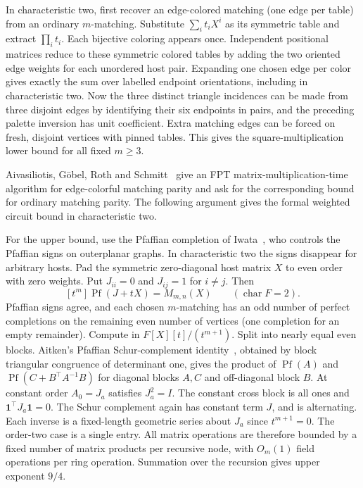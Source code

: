 \documentclass[11pt,letterpaper]{article}
\begin{document}
In characteristic two, first recover an edge-colored matching (one edge per table) from an ordinary \(m\)-matching. Substitute \(\sum_i t_iX^i\) as its symmetric table and extract \(\prod_i t_i\). Each bijective coloring appears once. Independent positional matrices reduce to these symmetric colored tables by adding the two oriented edge weights for each unordered host pair. Expanding one chosen edge per color gives exactly the sum over labelled endpoint orientations, including in characteristic two. Now the three distinct triangle incidences can be made from three disjoint edges by identifying their six endpoints in pairs, and the preceding palette inversion has unit coefficient. Extra matching edges can be forced on fresh, disjoint vertices with pinned tables. This gives the square-multiplication lower bound for all fixed \(m\ge3\).

Aivasiliotis, G\"obel, Roth and Schmitt~\cite[Theorem~10 and the discussion following it]{agrs-holant} give an FPT matrix-multiplication-time algorithm for edge-colorful matching parity and ask for the corresponding bound for ordinary matching parity. The following argument gives the formal weighted circuit bound in characteristic two.

For the upper bound, use the Pfaffian completion of Iwata~\cite[Lemmas~2.1--2.2 and Theorem~3.1]{iwata-matching-pfaffian}, who controls the Pfaffian signs on outerplanar graphs. In characteristic two the signs disappear for arbitrary hosts. Pad the symmetric zero-diagonal host matrix \(X\) to even order with zero weights. Put \(J_{ii}=0\) and \(J_{ij}=1\) for \(i\ne j\). Then
\[
              [t^m]\operatorname{Pf}(J+tX)=M_{m,n}(X)
              \qquad(\operatorname{char}F=2).
\]
Pfaffian signs agree, and each chosen \(m\)-matching has an odd number of perfect completions on the remaining even number of vertices (one completion for an empty remainder). Compute in \(F[X][t]/(t^{m+1})\). Split into nearly equal even blocks. Aitken's Pfaffian Schur-complement identity~\cite[Equation~(11)]{grb-pfaffian}, obtained by block triangular congruence of determinant one, gives the product of \(\operatorname{Pf}(A)\) and \(\operatorname{Pf}(C+B^\top A^{-1}B)\) for diagonal blocks \(A,C\) and off-diagonal block \(B\). At constant order \(A_0=J_a\) satisfies \(J_a^2=I\). The constant cross block is all ones and \(\mathbf1^\top J_a\mathbf1=0\). The Schur complement again has constant term \(J\), and is alternating. Each inverse is a fixed-length geometric series about \(J_a\) since \(t^{m+1}=0\). The order-two case is a single entry. All matrix operations are therefore bounded by a fixed number of matrix products per recursive node, with \(O_m(1)\) field operations per ring operation. Summation over the recursion gives upper exponent \(9/4\).
\end{document}
